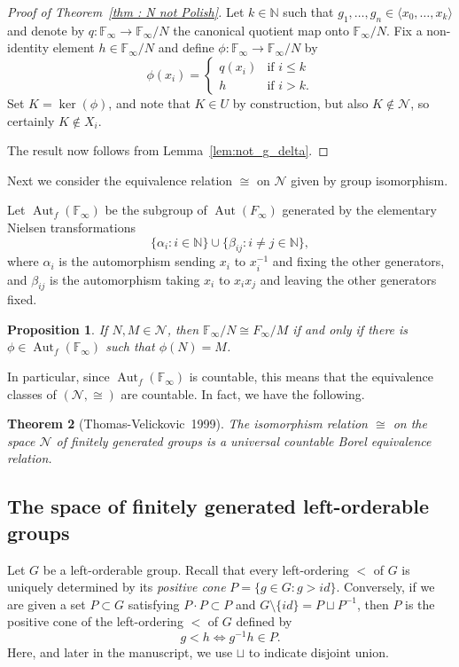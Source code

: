 \documentclass{amsart}
\newtheorem{theorem}{Theorem}[section]
\newtheorem{proposition}[theorem]{Proposition}
\theoremstyle{definition}
\theoremstyle{remark}
\DeclareMathOperator{\Aut}{Aut}
\begin{document}
\begin{proof}[Proof of Theorem~\ref{thm : N not Polish}]
    Let \(k\in \mathbb{N}\) such that \(g_1,\dotsc, g_n\in \langle x_0,\dotsc, x_k \rangle \) and denote by \(q\colon \mathbb{F}_\infty \to \mathbb{F}_\infty/N\) the canonical quotient map onto \(\mathbb{F}_\infty/N\). Fix a non-identity element $h \in \mathbb{F}_{\infty}/N$ and define $\phi \colon \mathbb{F}_{\infty} \rightarrow \mathbb{F}_{\infty}/N$ by 
    \[
\phi(x_i) =
\begin{cases}
    q(x_i) &\text{if $i \leq k$}\\
    h &\text{if $i>k$.} 
\end{cases}
\]
Set $K = \ker(\phi)$, and note that $K \in U$ by construction, but also $K \notin \mathcal{N}$, so certainly $K \notin X_i$.

The result now follows from Lemma~\ref{lem:not_g_delta}.
\end{proof}


Next we consider the equivalence relation $\cong$ on $\mathcal{N}$ given by group isomorphism.

Let \(\Aut_f(\mathbb{F}_\infty)\) be the subgroup of \(\Aut(F_\infty)\) generated by the
elementary Nielsen transformations
\[\{\alpha_i
: i \in\mathbb{N}\} \cup \{\beta_{ij} : i \neq j \in\mathbb{N} \},\]
where \(\alpha_i\)
is the automorphism sending \(x_i\) to \(x
^{-1}
_i\)
and fixing the other generators, and
\(\beta_{ij}\) is the automorphism taking \(x_i\) to \(x_ix_j\) and leaving the other generators fixed.   

\begin{proposition}\cite[Section~3]{Cha00}
    If \(N, M \in\mathcal{N} \), then
\(
\mathbb{F}_\infty/N \cong
F_\infty/M\) if and only if there is \(\phi\in \Aut_f(\mathbb{F}_\infty)\) such that \( \phi(N) = M\).
\end{proposition}

In particular, since \(\Aut_f(\mathbb{F}_\infty)\) is countable, this means that the equivalence classes of $(\mathcal{N}, \cong)$ are countable.  In fact, we have the following.

\begin{theorem}[Thomas-Velickovic~1999]
   The isomorphism relation  \(\cong\) on the space $\mathcal{N}$ of finitely generated groups is a universal countable Borel equivalence relation.
\end{theorem}


\subsection{The space of finitely generated left-orderable groups}
Let \(G\) be a left-orderable group. Recall that every left-ordering $<$ of $G$ is uniquely determined by its \emph{positive cone} $P = \{ g \in G : g>id \}$.  Conversely, if we are given a set $P \subset G$ satisfying $P \cdot P \subset P$ and $G \setminus \{id\} = P \sqcup P^{-1}$, then $P$ is the positive cone of the left-ordering $<$ of $G$ defined by 
\[ g<h \iff g^{-1}h \in P.
\]
Here, and later in the manuscript, we use $\sqcup$ to indicate disjoint union.
\end{document}
